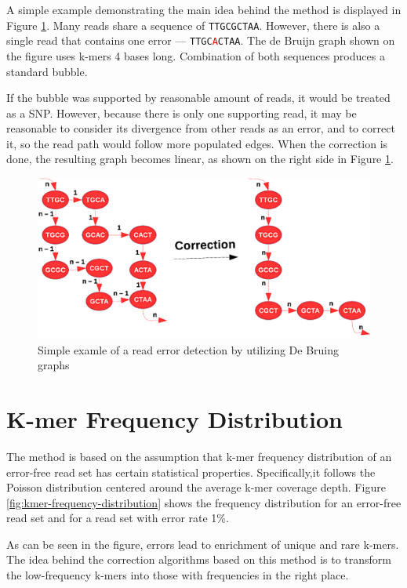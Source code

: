 A simple example demonstrating the main idea behind the method is displayed in Figure \ref{fig:error-correction-db}. Many reads share a sequence of \texttt{TTGCGCTAA}. However, there is also a single read that contains one error --- \texttt{TTGC{\textcolor{red}{A}}CTAA}. The de Bruijn graph shown on the figure uses k-mers 4 bases long. Combination of both sequences produces a standard bubble.

If the bubble was supported by reasonable amount of reads, it would be treated as a SNP. However, because there is only one supporting read, it may be reasonable to consider its divergence from other reads as an error, and to correct it, so the read path would follow more populated edges. When the correction is done, the resulting graph becomes linear, as shown on the right side in Figure \ref{fig:error-correction-db}.

\begin{figure}[h]
	\centering
	\includegraphics{img/error-correction-db.pdf}
	\caption{Simple examle of a read error detection by utilizing De Bruing graphs}
	\label{fig:error-correction-db}
\end{figure}

\section{K-mer Frequency Distribution}
\label{sec:ec-kmer-frequency-distribution}

The method is based on the assumption that k-mer frequency distribution of an error-free read set has certain statistical properties. Specifically,it follows the Poisson distribution centered around the average k-mer coverage depth.  Figure \ref{fig:kmer-frequency-distribution} shows the frequency distribution for an error-free read set and for a read set with error rate 1\%. 

As can be seen in the figure, errors lead to enrichment of unique and rare
k-mers. The idea behind the correction algorithms based on this method is to transform the low-frequency k-mers into those with frequencies in the right place.

